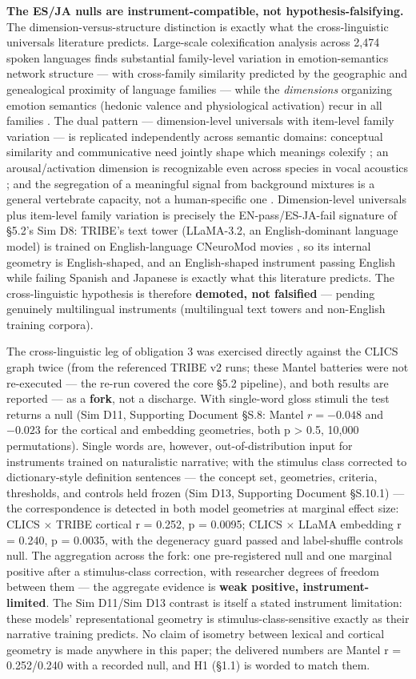 \documentclass[
]{article}
\begin{document}
\textbf{The ES/JA nulls are instrument-compatible, not
hypothesis-falsifying.} The dimension-versus-structure distinction is
exactly what the cross-linguistic universals literature predicts.
Large-scale colexification analysis across 2,474 spoken languages finds
substantial family-level variation in emotion-semantics network
structure --- with cross-family similarity predicted by the geographic
and genealogical proximity of language families --- while the
\emph{dimensions} organizing emotion semantics (hedonic valence and
physiological activation) recur in all families . The dual pattern ---
dimension-level universals with item-level family variation --- is
replicated independently across semantic domains: conceptual similarity
and communicative need jointly shape which meanings colexify ; an
arousal/activation dimension is recognizable even across species in
vocal acoustics ; and the segregation of a meaningful signal from
background mixtures is a general vertebrate capacity, not a
human-specific one . Dimension-level universals plus item-level family
variation is precisely the EN-pass/ES-JA-fail signature of §5.2's Sim
D8: TRIBE's text tower (LLaMA-3.2, an English-dominant language model)
is trained on English-language CNeuroMod movies , so its internal
geometry is English-shaped, and an English-shaped instrument passing
English while failing Spanish and Japanese is exactly what this
literature predicts. The cross-linguistic hypothesis is therefore
\textbf{demoted, not falsified} --- pending genuinely multilingual
instruments (multilingual text towers and non-English training corpora).

The cross-linguistic leg of obligation 3 was exercised directly against
the CLICS graph twice (from the referenced TRIBE v2 runs; these Mantel
batteries were not re-executed --- the re-run covered the core §5.2
pipeline), and both results are reported --- as a \textbf{fork}, not a
discharge. With single-word gloss stimuli the test returns a null (Sim
D11, Supporting Document §S.8: Mantel \(r = -0.048\) and \(-0.023\) for
the cortical and embedding geometries, both p \textgreater{} 0.5, 10,000
permutations). Single words are, however, out-of-distribution input for
instruments trained on naturalistic narrative; with the stimulus class
corrected to dictionary-style definition sentences --- the concept set,
geometries, criteria, thresholds, and controls held frozen (Sim D13,
Supporting Document §S.10.1) --- the correspondence is detected in both
model geometries at marginal effect size: CLICS \(\times\) TRIBE
cortical r = 0.252, p = 0.0095; CLICS \(\times\) LLaMA embedding r =
0.240, p = 0.0035, with the degeneracy guard passed and label-shuffle
controls null. The aggregation across the fork: one pre-registered null
and one marginal positive after a stimulus-class correction, with
researcher degrees of freedom between them --- the aggregate evidence is
\textbf{weak positive, instrument-limited}. The Sim D11/Sim D13 contrast
is itself a stated instrument limitation: these models' representational
geometry is stimulus-class-sensitive exactly as their narrative training
predicts. No claim of isometry between lexical and cortical geometry is
made anywhere in this paper; the delivered numbers are Mantel r =
0.252/0.240 with a recorded null, and H1 (§1.1) is worded to match them.
\end{document}
